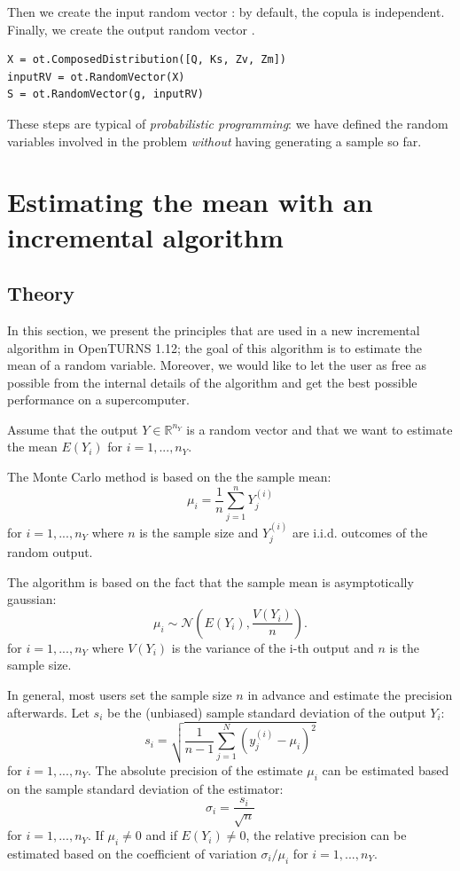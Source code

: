 \documentclass{article}
\begin{document}
Then we create the input random vector : by default, the copula is independent. 
Finally, we create the output random vector .
\begin{lstlisting}
X = ot.ComposedDistribution([Q, Ks, Zv, Zm])
inputRV = ot.RandomVector(X)
S = ot.RandomVector(g, inputRV)
\end{lstlisting}

These steps are typical of \emph{probabilistic programming}: we 
have defined the random variables involved in the problem 
\emph{without} having generating a sample so far.


\section{Estimating the mean with an incremental algorithm}


\subsection{Theory}

In this section, we present the principles that are used in a new incremental 
algorithm in OpenTURNS 1.12; the goal of this algorithm is to estimate the mean of a random variable. 
Moreover, we would like to let the user as free as possible from the internal details of the algorithm 
and get the best possible performance on a supercomputer.

Assume that the output $Y\in\mathbb{R}^{n_Y}$ is a random vector and that we want to estimate the 
mean $E(Y_i)$ for $i=1,...,n_Y$. 

The Monte Carlo method is based on the the sample mean: 
$$
\mu_i = \frac{1}{n} \sum_{j=1}^n Y_j^{(i)}
$$
for $i=1,...,n_Y$ where $n$ is the sample size and $Y_j^{(i)}$ are i.i.d. outcomes of the random output. 

The algorithm is based on the fact that the sample mean is asymptotically gaussian:
$$
\mu_i \sim \mathcal{N}\left(E(Y_i),\frac{V(Y_i)}{n}\right).
$$
for $i=1,...,n_Y$ where $V(Y_i)$ is the variance of the i-th output and $n$ is the sample size.

In general, most users set the sample size $n$ in advance and estimate the precision afterwards. 
Let $s_i$ be the (unbiased) sample standard deviation of the output $Y_i$:
$$
s_i = \sqrt{\frac{1}{n-1} \sum_{j=1}^N (y_j^{(i)}-\mu_i)^2}
$$
for $i=1,...,n_Y$. 
The absolute precision of the estimate $\mu_i$ can be estimated based on the sample standard deviation of the estimator:
$$
\sigma_i = \frac{s_i}{\sqrt{n}}
$$
for $i=1,...,n_Y$. 
If $\mu_i\neq 0$ and if $E(Y_i)\neq 0$, the relative precision can 
be estimated based on the coefficient of variation $\sigma_i/\mu_i$ 
for $i=1,...,n_Y$. 
 
\end{document}
